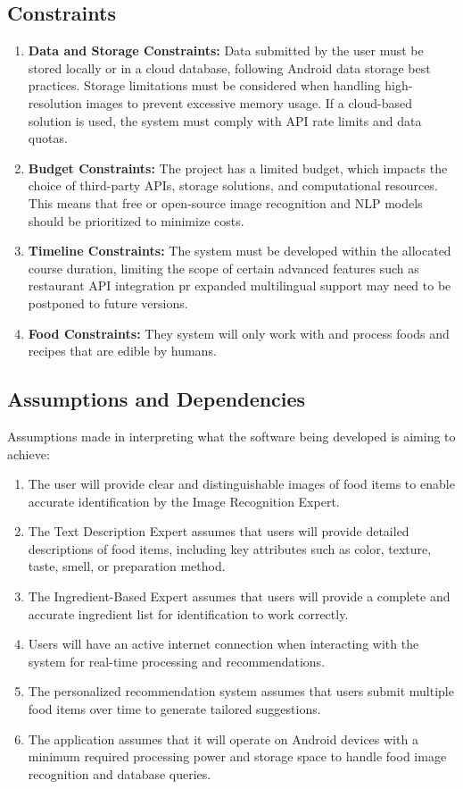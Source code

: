 \documentclass[]{article}
\begin{document}
\subsection{Constraints}
\label{sub:constraints}
\begin{enumerate}
	\item \textbf{Data and Storage Constraints: }Data submitted by the user must be stored locally or in a cloud database, following Android data storage best practices. Storage limitations must be considered when handling high-resolution images to prevent excessive memory usage. If a cloud-based solution is used, the system must comply with API rate limits and data quotas.
	\item \textbf{Budget Constraints: }The project has a limited budget, which impacts the choice of third-party APIs, storage solutions, and computational resources. This means that free or open-source image recognition and NLP models should be prioritized to minimize costs.
	\item \textbf{Timeline Constraints: }The system must be developed within the allocated course duration, limiting the scope of certain advanced features such as restaurant API integration pr expanded multilingual support may need to be postponed to future versions.
	\item \textbf{Food Constraints: } They system will only work with and process foods and recipes that are edible by humans.
\end{enumerate}

\subsection{Assumptions and Dependencies}
\label{sub:assumptions_and_dependencies}
Assumptions made in interpreting what the software being developed is aiming to achieve:
	\begin{enumerate}
		\item The user will provide clear and distinguishable images of food items to enable accurate identification by the Image Recognition Expert.
		\item The Text Description Expert assumes that users will provide detailed descriptions of food items, including key attributes such as color, texture, taste, smell, or preparation method.
		\item The Ingredient-Based Expert assumes that users will provide a complete and accurate ingredient list for identification to work correctly.
		\item Users will have an active internet connection when interacting with the system for real-time processing and recommendations.
		\item The personalized recommendation system assumes that users submit multiple food items over time to generate tailored suggestions.
		\item The application assumes that it will operate on Android devices with a minimum required processing power and storage space to handle food image recognition and database queries.
	\end{enumerate}
\end{document}
